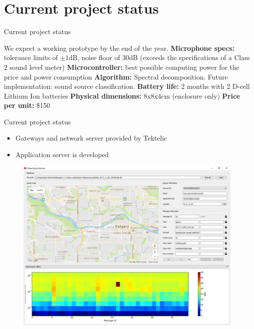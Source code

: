 \documentclass{beamer}
\begin{document}
\section{Current project status}

    \begin{frame}{Current project status}
        
        We expect a working prototype by the end of the year.
        \vfill 
        {\bf Microphone specs:} tolerance limits of $\pm 1$dB, noise floor of 30dB (\alert{exceeds} the specifications of a Class 2 sound level meter)
        \vfill
        {\bf Microcontroller:} best possible computing power for the price and power consumption 
        \vfill 
        {\bf Algorithm:} Spectral decomposition. Future implementation: sound source classification. 
        \vfill 
        {\bf Battery life:} 2 months with 2 D-cell Lithium Ion batteries
        \vfill 
        {\bf Physical dimensions:} 8x8x4cm (enclosure only)
        \vfill
        {\bf Price per unit:} \$150
        
    \end{frame}
    
    \begin{frame}{Current project status}
        
        \begin{itemize}
            \item Gateways and network server provided by Tektelic
            \item Application server is developed
        \end{itemize}
        \vfill 
        \begin{center}
            \begin{figure}
                \centering
                \includegraphics[scale=0.25]{figures/gui.PNG}
            \end{figure}
        \end{center}
        
    \end{frame}
\end{document}

